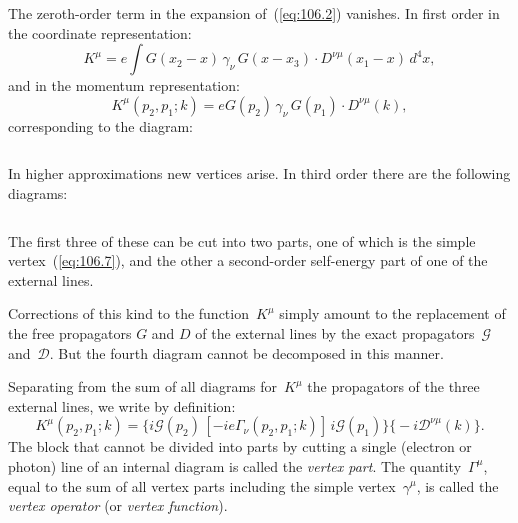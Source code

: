 The zeroth-order term in the expansion of~(\ref{eq:106.2}) vanishes. In first order in the coordinate representation:
\[
K^\mu = e \int G(x_2 - x)\,\gamma_\nu\,G(x - x_3)\cdot D^{\nu\mu}(x_1 - x)\,d^4x,
\]
and in the momentum representation:
\begin{equation}
K^\mu(p_2, p_1; k) = eG(p_2)\,\gamma_\nu\,G(p_1)\cdot D^{\nu\mu}(k),
\label{eq:106.6}
\end{equation}
corresponding to the diagram:

\begin{equation}
\label{eq:106.7}
\end{equation}

In higher approximations new vertices arise. In third order there are the following diagrams:

\begin{equation}
\label{eq:106.8}
\end{equation}

\noindent The first three of these can be cut into two parts, one of which is the simple vertex~(\ref{eq:106.7}), and the other a second-order self-energy part of one of the external lines.


Corrections of this kind to the function~$K^\mu$ simply amount to the replacement of the free propagators $G$ and $D$ of the external lines by the exact propagators~$\mathcal{G}$ and~$\mathcal{D}$. But the fourth diagram cannot be decomposed in this manner.

Separating from the sum of all diagrams for~$K^\mu$ the propagators of the three external lines, we write by definition:
\begin{equation}
K^\mu(p_2, p_1; k) = \bigl\{i\mathcal{G}(p_2)\,[-ie\Gamma_\nu(p_2, p_1; k)]\,i\mathcal{G}(p_1)\bigr\}\bigl\{-i\mathcal{D}^{\nu\mu}(k)\bigr\}.
\label{eq:106.9}
\end{equation}
The block that cannot be divided into parts by cutting a single (electron or photon) line of an internal diagram is called the \emph{vertex part}. The quantity~$\Gamma^\mu$, equal to the sum of all vertex parts including the simple vertex~$\gamma^\mu$, is called the \emph{vertex operator} (or \emph{vertex function}).

